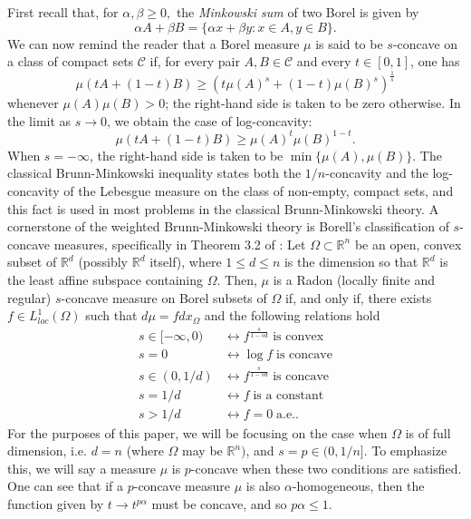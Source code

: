 \documentclass[11pt]{amsart}
\theoremstyle{definition}
\theoremstyle{remark}
\numberwithin{equation}{section}
\newcommand{\R}{\mathbb{R}}
\begin{document}
First recall that, for $\alpha,\beta\geq 0,$ the \textit{Minkowski sum} of two Borel is given by
$$\alpha A+\beta B=\{\alpha x + \beta y: x\in A, y\in B\}.$$ We can now remind the reader that a Borel measure $\mu$ is said to be $s$-concave on a class of compact sets $\mathcal{C}$ if, for every pair $A,B \in \mathcal{C}$  and every $t \in [0,1]$, one has
	$$\mu(t A +(1-t)B)\geq \left(t\mu(A)^s +(1-t)\mu(B)^{s}\right)^{\frac{1}{s}}$$
whenever $\mu(A)\mu(B) > 0$; the right-hand side is taken to be zero otherwise. In the limit as $s\rightarrow 0$, we obtain the case of log-concavity:
	$$\mu(t A +(1-t)B)\geq\mu(A)^{t}\mu(B)^{1-t}.$$
	When $s=-\infty$, the right-hand side is taken to be $\min\{\mu(A),\mu(B)\}$. 
 The classical Brunn-Minkowski inequality states both the $1/n$-concavity and the log-concavity of the Lebesgue measure on the class of non-empty, compact sets, and this fact is used in most problems in the classical Brunn-Minkowski theory. A cornerstone of the weighted Brunn-Minkowski theory is Borell's classification of $s$-concave measures, specifically in Theorem 3.2 of \cite{Bor75}:
Let $\Omega\subset\R^n$ be an open, convex subset of $\R^d$ (possibly $\R^d$ itself), where $1\leq d \leq n$ is the dimension so that $\R^d$ is the least affine subspace containing $\Omega$. Then, $\mu$ is a Radon (locally finite and regular) $s$-concave measure on Borel subsets of $\Omega$ if, and only if, there exists $f\in L^1_{loc}(\Omega)$ such that $d\mu=fdx_{\Omega}$ and the following relations hold
	\begin{align*}
	    s\in[-\infty,0) &\longleftrightarrow f^{\frac{s}{1-sd}} \; \text{is convex}
	    \\
	    s=0 &\longleftrightarrow \log f \; \text{is concave}
	    \\
	    s\in(0,1/d) &\longleftrightarrow f^{\frac{s}{1-sd}} \; \text{is concave}
	    \\
	    s=1/d &\longleftrightarrow f \; \text{is a constant}
	    \\
	    s>1/d &\longleftrightarrow f=0 \; \text{a.e.}.
	\end{align*}
For the purposes of this paper, we will be focusing on the case when $\Omega$ is of full dimension, i.e. $d=n$ (where $\Omega$ may be $\R^n)$, and $s=p\in (0,1/n].$ To emphasize this, we will say a measure $\mu$ is $p$-concave when these two conditions are satisfied. One can see that if a $p$-concave measure $\mu$ is also $\alpha$-homogeneous, then the function given by $t\to t^{p\alpha}$ must be concave, and so $p\alpha\leq 1$. 
\end{document}
